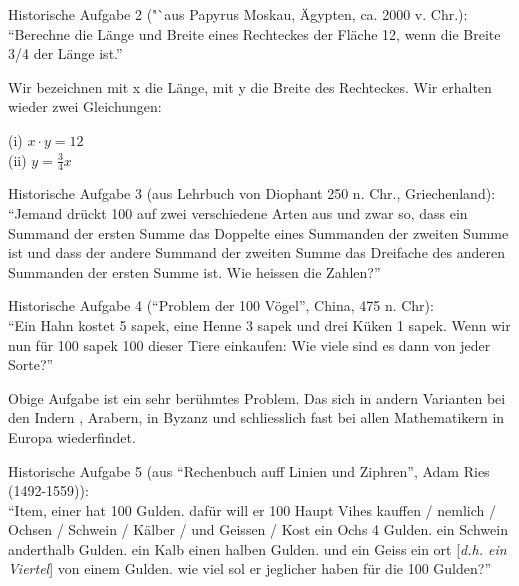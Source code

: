 \documentclass[11pt,oneside]{article}
\begin{document}
	\begin{center}
		\begin{framed}
			Historische Aufgabe 2 ("`aus Papyrus Moskau, Ägypten, ca. 2000 v. Chr.):\\
			"`Berechne die Länge und Breite eines Rechteckes
			der Fläche 12, wenn die Breite 3/4 der Länge ist."'
		\end{framed}
	\end{center}
	Wir bezeichnen mit x die Länge, mit y die Breite des Rechteckes. Wir
	erhalten wieder zwei Gleichungen:
	\begin{center}
		(i) $x\cdot y=12$\\
		(ii) $y = \frac{3}{4}x$
	\end{center}
	\begin{center}
		\begin{framed}
			Historische Aufgabe 3 (aus Lehrbuch von Diophant 250 n. Chr., Griechenland):\\
			"`Jemand drückt 100 auf zwei verschiedene Arten aus und zwar so, dass ein Summand der ersten Summe das Doppelte eines Summanden der zweiten Summe ist und dass der andere Summand der zweiten Summe das Dreifache des anderen Summanden der ersten Summe ist. Wie heissen die Zahlen?"'
		\end{framed}
	\end{center}
	\begin{center}
		\begin{framed}
			Historische Aufgabe 4 ("`Problem der 100 Vögel"', China, 475 n. Chr):\\
			"`Ein Hahn kostet 5 sapek, eine Henne 3 sapek und drei Küken 1 sapek. Wenn wir nun für 100 sapek 100 dieser Tiere einkaufen: Wie viele sind es dann von jeder Sorte?"'
		\end{framed}
	\end{center}
	Obige Aufgabe ist ein sehr berühmtes Problem. Das sich in andern Varianten bei den Indern , Arabern, in Byzanz und schliesslich fast bei allen Mathematikern in Europa wiederfindet.
	\begin{center}
		\begin{framed}
			Historische Aufgabe 5 (aus "`Rechenbuch auff Linien und Ziphren"', Adam Ries (1492-1559)):\\

			"`Item, einer hat 100 Gulden. dafür will er 100 Haupt Vihes kauffen / nemlich / Ochsen / Schwein / Kälber / und Geissen / Kost ein Ochs 4 Gulden. ein Schwein anderthalb Gulden. ein Kalb
			einen halben Gulden. und ein Geiss ein ort [\textit{d.h. ein Viertel}] von einem Gulden. wie viel sol er jeglicher haben für die 100 Gulden?"'
		\end{framed}
	\end{center}
\end{document}
